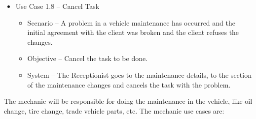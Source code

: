 \begin{itemize}
    \item Use Case 1.8 – Cancel Task 
    \begin{itemize}
      \item Scenario – A problem in a vehicle maintenance has occurred and the initial agreement with the client was broken and the client refuses the changes.
      \item Objective – Cancel the task to be done.
      \item System – The Receptionist goes to the maintenance details, to the section of the maintenance changes and cancels the task with the problem.
    \end{itemize}
  \end{itemize}  
  \hfill \break


 The mechanic will be responsible for doing the maintenance in the vehicle, like oil change, tire change, trade vehicle parts, etc. 
 The mechanic use cases are:

